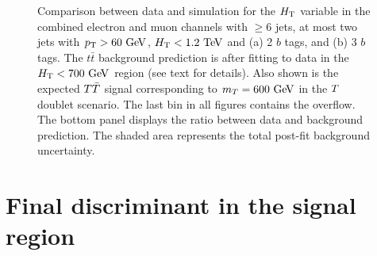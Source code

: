 \begin{figure}[htb]\begin{center}
	\caption{Comparison between data and simulation for the $\HT$ variable 
        in the combined
        electron and muon channels with $\geq 6$ jets, at most two jets with $\pt>60\gev$,
        $\HT<1.2\tev$ and (a) 2 $b$ tags, and (b) 3 $b$ tags.
        The $t\bar{t}$ background prediction is after fitting to data in the $\HT<700\gev$ region (see text for details).
        Also shown is the expected $\TT$ signal corresponding to $m_{\T}=600\gev$ in the $\T$ doublet scenario.
        The last bin in all figures contains the overflow. The bottom panel displays the ratio between data
        and background prediction. The shaded area represents the total post-fit background uncertainty.  
\label{fig:HT_signalregion_control}}
\end{center}\end{figure}


\section{Final discriminant in the signal region}\label{sec:htxDISCR}


